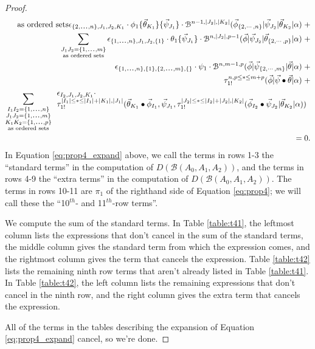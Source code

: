 \begin{proof}
\begin{equation}
\begin{aligned}
{{  \textrm{as ordered sets}}}
\epsilon_{\{2,\smdots,n\},J_1,J_2,K_1} \cdot
\phi_1 \{\vec{\theta}_{K_1}\} \{\vec{\psi}_{J_1}\} \cdot
     \mathcal{B}^{n-1, |J_2|, |K_2|}
     (\vec{\phi}_{\{2,\cdots,n\}} | \vec{\psi}_{J_2} | \vec{\theta}_{K_2} | \alpha) \; + \\
\sum \limits_{\substack{
  J_1J_2 = \{1,\smdots,m\}\\
  \textrm{as ordered sets}}}
\epsilon_{\{1,\smdots,n\},J_1,J_2,\{1\}} \cdot     
\theta_1 \{\vec{\psi}_{J_1}\} \cdot
     \mathcal{B}^{n, |J_2|, p-1}
     (\vec{\phi} | \vec{\psi}_{J_2} | \vec{\theta}_{\{2,\cdots,p\}} | \alpha) \; +\\
\epsilon_{\{1,\smdots,n\},\{1\},\{2,\smdots,m\},\{\}} \cdot        
\psi_1 \cdot
     \mathcal{B}^{n,m-1,p}
     (\vec{\phi} | \vec{\psi}_{\{2,\cdots,m\}} | \vec{\theta} | \alpha) \; + \\
\tau_{1!}^{n, p \leq * \leq m+p}(\vec{\phi} | \vec{\psi} \bullet \vec{\theta} | \alpha ) \; + \\
\sum \limits_{\substack{
  I_1I_2 = \{1,\smdots,n\}\\
  J_1J_2 = \{1,\smdots,m\}\\
  K_1K_2 = \{1,\smdots,p\}\\
  \textrm{as ordered sets}}}
\begin{array}{l}
\epsilon_{I_2,J_1,J_2,K_1} \cdot \\
\tau_{1!}^{|I_1| \leq * \leq |I_1| + |K_1|,|J_1|}(\vec{\theta}_{K_1} \bullet \vec{\phi}_{I_1}, \vec{\psi}_{J_1}, 
    \tau_{1!}^{|J_2| \leq * \leq |I_2| + |J_2|,|K_2|}(\vec{\phi}_{I_2} \bullet \vec{\psi}_{J_2} | \vec{\theta}_{K_2} | \alpha )) 
\end{array} \\
%
=0.
\end{aligned}
\end{equation}
In Equation \ref{eq:prop4_expand} above, 
we call the terms in rows 1-3 the 
``standard terms'' in the computation of 
$D(\mathcal{B}(A_0,A_1,A_2))$, and the terms in rows 
4-9 the ``extra terms'' in the computation 
of $D(\mathcal{B}(A_0,A_1,A_2))$. The terms in rows 10-11 
are $\pi_1$ of the righthand side of Equation 
\ref{eq:prop4}; we will call these the 
``10$^{th}$- and 11$^{th}$-row terms''.

We compute the sum of the standard terms. 
In Table \ref{table:t41}, the leftmost column lists 
the expressions that don't cancel in the sum 
of the standard terms, the middle column gives 
the standard term from which the expression comes, 
and the rightmost column gives the term that 
cancels the expression. Table \ref{table:t42} 
lists the remaining ninth row terms that aren't 
already listed in Table \ref{table:t41}. In 
Table \ref{table:t42}, the left column lists 
the remaining expressions that don't cancel in 
the ninth row, and the right column gives 
the extra term that cancels the expression. 

All of the terms in the tables describing 
the expansion of Equation \ref{eq:prop4_expand} 
cancel, so we're done.
\end{proof}
